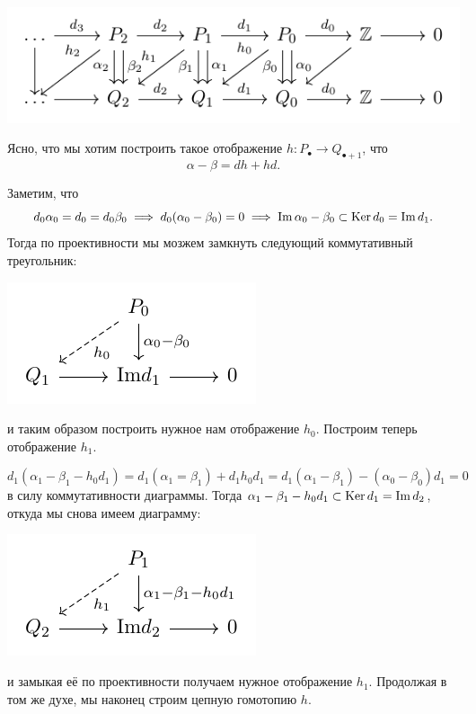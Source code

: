	\begin{center}
		\includegraphics{lectures/5/pictures/pic_9.pdf}
	\end{center}

	Ясно, что мы хотим построить такое отображение $h\colon P_{\bullet} \to Q_{\bullet + 1}$, что 
	\[
		\alpha - \beta = dh + hd.
	\]

	Заметим, что 
	\[
		d_0 \alpha_0 = d_0 = d_0 \beta_0 \implies d_0(\alpha_0 - \beta_0) = 0 \implies \mathop{\mathrm{Im}}\nolimits{\alpha_0 - \beta_0} \subset \operatorname{Ker}{d_0} = \mathop{\mathrm{Im}}\nolimits{d_1}.
	\]
	Тогда по проективности мы мозжем замкнуть следующий коммутативный треугольник:
	\begin{center}
			\includegraphics{lectures/5/pictures/pic_7.pdf}
		\end{center}
	и таким образом построить нужное нам отображение $h_0$.  Построим теперь отображение $h_1$. 

	\[
		d_1(\alpha_1 - \beta_1 - h_0 d_1) = d_1(\alpha_1 = \beta_1) + d_1 h_0 d_1 = d_1(\alpha_1 - \beta_1) - (\alpha_0 - \beta_0) d_1 = 0
	\]
	в силу коммутативности диаграммы. Тогда $\alpha_1 - \beta_1 - h_0 d_1 \subset \operatorname{Ker}{d_1} = \mathop{\mathrm{Im}}\nolimits{d_2}$, откуда мы снова имеем диаграмму: 
	\begin{center}
			\includegraphics{lectures/5/pictures/pic_8.pdf}
		\end{center}
	и замыкая её по проективности получаем нужное отображение $h_1$. Продолжая в том же духе, мы наконец строим цепную гомотопию $h$. 	

